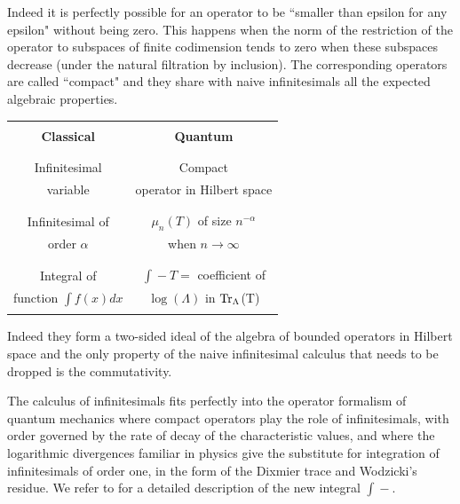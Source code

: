 \documentclass[12pt]{article}
\def\Tr{{\rm Tr}}
\def\Tr{{\rm Tr}}
\begin{document}
Indeed it is perfectly possible for an operator to be ``smaller than epsilon for any epsilon" without being zero. This happens when the norm of the restriction of the operator to subspaces of finite codimension tends to zero when these subspaces decrease (under the natural filtration by inclusion). The corresponding operators are called ``compact" and they share with naive infinitesimals all the expected algebraic properties. \bigskip
\begin{center}
\begin{tabular}{|c|c|}
\hline &  \\
{\bf \color{blue}Classical } & {\bf \color{blue}Quantum }
\\
&\\
\hline &  \\
 Infinitesimal  & Compact  \\
variable & operator in Hilbert space\\
&\\
\hline &  \\
 Infinitesimal of &  $\mu_n(T)$ of size $n^{-\alpha}$   \\
 order $\alpha$ & when $n \to \infty$  \\
&\\ \hline &  \\
  Integral of  & $\displaystyle{\int\!\!\!\!\!\! -} T =$ coefficient of \\
function $\int f(x)dx$ & $\log(\Lambda)$ in $\Tr_\Lambda$(T)\\
&\\ \hline 
\end{tabular}

\end{center}

\bigskip
Indeed they form a two-sided ideal of the algebra of bounded operators in Hilbert space and the only property of the naive infinitesimal calculus that needs to be dropped is the commutativity. 

The calculus of infinitesimals fits perfectly into the operator formalism of quantum mechanics where compact operators play the role of infinitesimals, with order governed by the rate of decay of the characteristic values,  and where the logarithmic divergences familiar in physics give the substitute for integration of infinitesimals of order one, in the form of the Dixmier trace and Wodzicki's residue. We refer to \cite{Co-book} for a detailed description of the new integral $\displaystyle{\int\!\!\!\!\!\! -}$.
\end{document}
